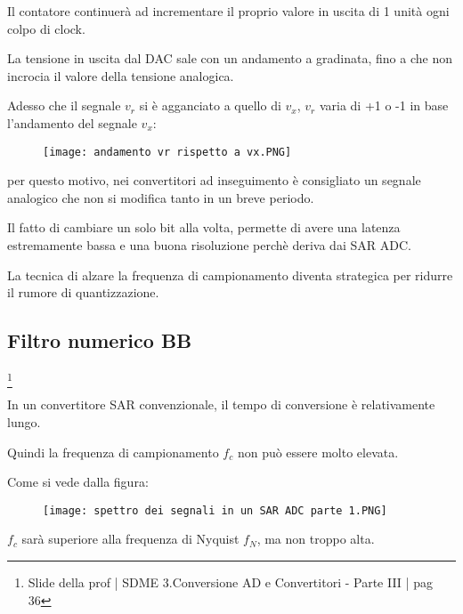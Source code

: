 Il contatore continuerà ad incrementare il proprio valore in uscita di 1 unità ogni colpo di clock. \newline 

La tensione in uscita dal DAC sale con un andamento a gradinata, 
fino a che non incrocia il valore della tensione analogica. \newline 

Adesso che il segnale $v_r$ si è agganciato a quello di $v_x$, $v_r$ varia di +1 o -1 in base l'andamento del segnale $v_x$: 

\begin{figure}[h]
    \centering
    \texttt{[image: andamento vr rispetto a vx.PNG]}
\end{figure}

per questo motivo, nei convertitori ad inseguimento è consigliato un segnale analogico che non si modifica tanto in un breve periodo. \newline 

Il fatto di cambiare un solo bit alla volta, permette di avere una latenza estremamente bassa e una buona risoluzione perchè deriva dai SAR ADC. \newline 

La tecnica di alzare la frequenza di campionamento diventa strategica per ridurre il rumore di quantizzazione. \newline 

\newpage 

\subsection{Filtro numerico BB}
\footnote{Slide della prof | SDME 3.Conversione AD e Convertitori - Parte III | pag 36}

In un convertitore SAR convenzionale, il tempo di conversione è relativamente lungo. \newline 

Quindi la frequenza di campionamento $f_c$ non può essere molto elevata. \newline 

Come si vede dalla figura: 

\begin{figure}[h]
    \centering
    \texttt{[image: spettro dei segnali in un SAR ADC parte 1.PNG]}
\end{figure}

$f_c$ sarà superiore alla frequenza di Nyquist $f_N$, ma non troppo alta. \newline 

